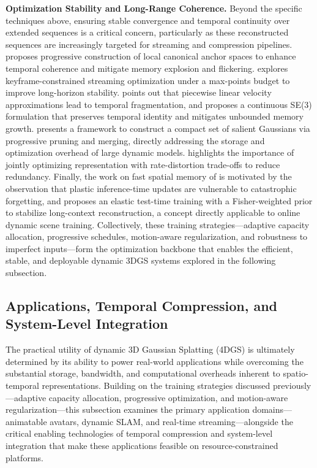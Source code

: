 \documentclass[11pt]{article}
\begin{document}
\textbf{Optimization Stability and Long-Range Coherence.} Beyond the specific techniques above, ensuring stable convergence and temporal continuity over extended sequences is a critical concern, particularly as these reconstructed sequences are increasingly targeted for streaming and compression pipelines. \cite{ref391} proposes progressive construction of local canonical anchor spaces to enhance temporal coherence and mitigate memory explosion and flickering. \cite{ref392} explores keyframe-constrained streaming optimization under a max-points budget to improve long-horizon stability. \cite{ref393} points out that piecewise linear velocity approximations lead to temporal fragmentation, and proposes a continuous SE(3) formulation that preserves temporal identity and mitigates unbounded memory growth. \cite{ref394} presents a framework to construct a compact set of salient Gaussians via progressive pruning and merging, directly addressing the storage and optimization overhead of large dynamic models. \cite{ref395} highlights the importance of jointly optimizing representation with rate-distortion trade-offs to reduce redundancy. Finally, the work on fast spatial memory of \cite{ref396} is motivated by the observation that plastic inference-time updates are vulnerable to catastrophic forgetting, and proposes an elastic test-time training with a Fisher-weighted prior to stabilize long-context reconstruction, a concept directly applicable to online dynamic scene training. Collectively, these training strategies---adaptive capacity allocation, progressive schedules, motion-aware regularization, and robustness to imperfect inputs---form the optimization backbone that enables the efficient, stable, and deployable dynamic 3DGS systems explored in the following subsection.

\subsection{Applications, Temporal Compression, and System-Level Integration}

The practical utility of dynamic 3D Gaussian Splatting (4DGS) is ultimately determined by its ability to power real-world applications while overcoming the substantial storage, bandwidth, and computational overheads inherent to spatio-temporal representations. Building on the training strategies discussed previously---adaptive capacity allocation, progressive optimization, and motion-aware regularization---this subsection examines the primary application domains---animatable avatars, dynamic SLAM, and real-time streaming---alongside the critical enabling technologies of temporal compression and system-level integration that make these applications feasible on resource-constrained platforms.
\end{document}
